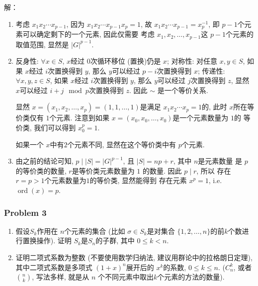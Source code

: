 \documentclass[a4paper,12pt]{ctexart}
\newcommand{\ord}{\operatorname{ord}}
\begin{document}
    解：
    \begin{enumerate}
      \item 考虑 $ x_1x_2\cdots x_{p-1} $, 因为 $ x_1x_2\cdots x_{p-1}x_p=1 $, 故 $ x_1x_2\cdots x_{p-1}=x_p^{-1} $, 即 $ p-1 $个元素可以确定剩下的一个元素, 因此仅需要
      考虑 $ x_1,x_2,\dots,x_{p-1} $这 $ p-1 $个元素的取值范围, 显然是 $ |G|^{p-1} $.
      \item 反身性: $ \forall x\in S $, $ x $经过 $ 0 $次循环移位 (置换)仍是 $ x $; 对称性: 
      对任意 $ x,y\in S $, 如果 $ x $经过 $ i $次置换得到 $ y $, 那么 $ y $可以经过 $ p-i $次置换得到 $x$; 传递性: $ \forall x,y,z\in S $, 如果 $ x $经过 $ i $次置换得到 $ y $, 那么 $ y $可以经过 $ j $次置换得到 $z$, 显然 $ x $可以经过 $ i+j\mod{p} $次置换得到 $ z $. 因此 $ \sim $
      是一个等价关系.

      显然 $ x=(x_1,x_2,\dots,x_p)=(1,1,\dots,1) $是满足 $ x_1x_2\cdots x_p=1 $的, 此时 $ x $所在等价类仅有 $ 1 $个元素. 注意到如果 $ x=(x_0,x_0,\dots,x_0) $是一个元素数量为 $ 1 $的 等价类, 我们可以得到 $ x_0^p=1 $.

      如果一个 $ x $中有$2$个元素不同, 显然在这个等价类中有 $ p $个元素.
      
      \item 由之前的结论可知, $ p\mid |S|=|G|^{p-1} $, 且 $ |S|= np+r $, 其中 $ n $是元素数量
      是 $ p $的等价类的数量, $ r $是等价类元素数量为 $1$ 的数量. 因此 $ p\mid r $, 所以 存在$r=p>1$个元素数量为$1$的等价类, 显然能得到 存在元素 $ x^p=1 $, i.e. $ \ord(x)=p $.
    \end{enumerate}

\subsubsection*{Problem 3}
\begin{enumerate}
  \item 假设$ S_k $作用在 $ n $个元素的集合 
  (比如 $ \sigma\in S_k $是对集合 $ \{1,2,\dots,n\} $的前$ k $个数进行置换操作). 
  证明 $ S_k $是$ S_n $的子群, 其中 $ 0\leq k<n $.
  \item 证明二项式系数为整数 (不要使用数学归纳法, 建议用群论中的拉格朗日定理), 
  其中二项式系数是多项式 $ (1+x)^n $展开后的 $ x^k $的系数, 
  $ 0\leq k\leq n $. ($ C_n^k $, 或者 $ \binom{n}{k} $, 写法多样, 
  就是从 $n$ 个不同元素中取出$k$个元素的方法的数量). 
\end{enumerate}
\end{document}
